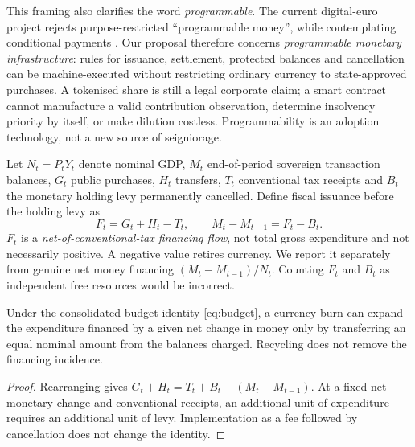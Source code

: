 \begin{table}[htbp]\centering\small
\caption{Implementation comparison: separate account systems and programmable value rails}

\end{table}

This framing also clarifies the word \emph{programmable}. The current digital-euro project rejects purpose-restricted ``programmable money'', while contemplating conditional payments \citep{ecbfaq2026}. Our proposal therefore concerns \emph{programmable monetary infrastructure}: rules for issuance, settlement, protected balances and cancellation can be machine-executed without restricting ordinary currency to state-approved purchases. A tokenised share is still a legal corporate claim; a smart contract cannot manufacture a valid contribution observation, determine insolvency priority by itself, or make dilution costless. Programmability is an adoption technology, not a new source of seigniorage.

Let $N_t=P_tY_t$ denote nominal GDP, $M_t$ end-of-period sovereign transaction balances, $G_t$ public purchases, $H_t$ transfers, $T_t$ conventional tax receipts and $B_t$ the monetary holding levy permanently cancelled. Define fiscal issuance before the holding levy as
\begin{equation}
F_t=G_t+H_t-T_t,\qquad M_t-M_{t-1}=F_t-B_t.\label{eq:budget}
\end{equation}
$F_t$ is a \emph{net-of-conventional-tax financing flow}, not total gross expenditure and not necessarily positive. A negative value retires currency. We report it separately from genuine net money financing $(M_t-M_{t-1})/N_t$. Counting $F_t$ and $B_t$ as independent free resources would be incorrect.

\begin{proposition}
Under the consolidated budget identity \eqref{eq:budget}, a currency burn can expand the expenditure financed by a given net change in money only by transferring an equal nominal amount from the balances charged. Recycling does not remove the financing incidence.
\end{proposition}
\begin{proof}
Rearranging gives $G_t+H_t=T_t+B_t+(M_t-M_{t-1})$. At a fixed net monetary change and conventional receipts, an additional unit of expenditure requires an additional unit of levy. Implementation as a fee followed by cancellation does not change the identity.
\end{proof}

